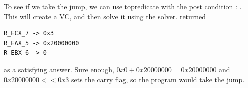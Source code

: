 

To see if we take the jump, we can use topredicate with the post
condition : .  This will create a VC, and then
solve it using the  solver.   returned
\begin{verbatim}
R_ECX_7 -> 0x3
R_EAX_5 -> 0x20000000
R_EBX_6 -> 0
\end{verbatim}
as a satisfying answer. Sure enough, $0x0 + 0x20000000 = 0x20000000$
and $0x20000000 << 0x3$ sets the carry flag, so the program would take the jump.


